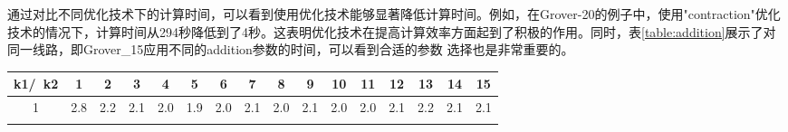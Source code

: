 通过对比不同优化技术下的计算时间，可以看到使用优化技术能够显著降低计算时间。例如，在Grover-20的例子中，使用"contraction"优化技术的情况下，计算时间从294秒降低到了4秒。这表明优化技术在提高计算效率方面起到了积极的作用。同时，表\ref{table:addition}展示了对同一线路，即Grover\_15应用不同的addition参数的时间，可以看到合适的参数
选择也是非常重要的。
\begin{table}[!htbp]
    \centering
    \begin{tabular}{c|ccccccccccccccc}
        \rowcolor[HTML]{FFFFFF} 
k1/\ k2                      & 1                           & 2                           & 3                           & 4                           & 5                           & 6                           & 7                          & 8                           & 9                           & 10                          & 11                          & 12                          & 13                          & 14                          & 15                          \\\hline
            \rowcolor[HTML]{FFFFFF} 
    1                          & 2.8                                              & 2.2                         & 2.1                         & \cellcolor[HTML]{CCC0DA}2.0 & \cellcolor[HTML]{CCC0DA}1.9 & \cellcolor[HTML]{CCC0DA}2.0                      & 2.1                        & \cellcolor[HTML]{CCC0DA}2.0 & 2.1                         & \cellcolor[HTML]{CCC0DA}2.0 & \cellcolor[HTML]{CCC0DA}2.0 & 2.1                         & 2.2                         & 2.1                         & 2.1                         \\ \cline{3-7}
    \rowcolor[HTML]{CCC0DA} 
    

\end{tabular}
\end{table}
